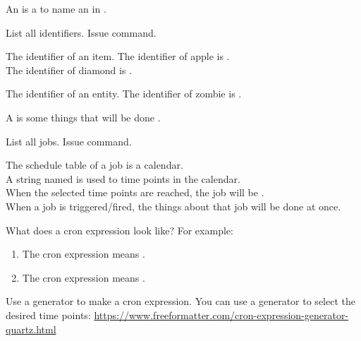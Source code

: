 \clearpage
{}

An  is a  to name an  in .

\begin{tips}{List all identifiers.}
    Issue  command.
\end{tips}


\begin{example}{The identifier of an item.}
    The identifier of apple is .\\
    The identifier of diamond is .
\end{example}

\begin{example}{The identifier of an entity.}
    The identifier of zombie is .
\end{example}


\clearpage
{}\label{sec:job}

A  is some things that will be done .

\begin{tips}{List all jobs.}
    Issue  command.
\end{tips}

The schedule table of a job is a calendar. \\
A string named  is used to  time points in the calendar. \\
When the selected time points are reached, the job will be . \\
When a job is triggered/fired, the things about that job will be done at once.

\begin{example}{What does a cron expression look like?}
    For example:
    \begin{enumerate}
        \item {The cron expression  means .}
        \item {The cron expression  means .}
    \end{enumerate}
\end{example}

\begin{tips}{Use a generator to make a cron expression.}
    You can use a generator to select the desired time points:
    \url{https://www.freeformatter.com/cron-expression-generator-quartz.html}
\end{tips}



